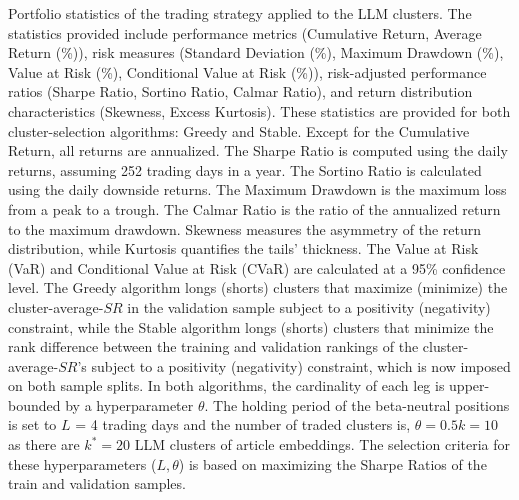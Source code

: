\begin{table}[H]
\begin{minipage}{\textwidth}
{Portfolio statistics of the trading strategy applied to the LLM clusters.
The statistics provided include performance metrics (Cumulative Return, Average Return (\%)), risk measures (Standard Deviation (\%), Maximum Drawdown (\%), Value at Risk (\%), Conditional Value at Risk (\%)), risk-adjusted performance ratios (Sharpe Ratio, Sortino Ratio, Calmar Ratio), and return distribution characteristics (Skewness, Excess Kurtosis). These statistics are provided for both cluster-selection algorithms: Greedy and Stable. 
Except for the Cumulative Return, all returns are annualized. The Sharpe Ratio is computed using the daily returns, assuming 252 trading days in a year. The Sortino Ratio is calculated using the daily downside returns. The Maximum Drawdown is the maximum loss from a peak to a trough. The Calmar Ratio is the ratio of the annualized return to the maximum drawdown. Skewness measures the asymmetry of the return distribution, while Kurtosis quantifies the tails' thickness. The Value at Risk (VaR) and Conditional Value at Risk (CVaR) are calculated at a 95\% confidence level.
The Greedy algorithm longs (shorts) clusters that maximize (minimize) the cluster-average-$SR$ in the validation sample subject to a positivity (negativity) constraint, while the Stable algorithm longs (shorts) clusters that minimize the rank difference between the training and validation rankings of the cluster-average-$SR$'s subject to a positivity (negativity) constraint, which is now imposed on both sample splits. In both algorithms, the cardinality of each leg is upper-bounded by a hyperparameter $\theta$. 
The holding period of the beta-neutral positions is set to $L$ = 4 trading days and the number of traded clusters is, $\theta = 0.5k=10$ as there are $k^*=20$ LLM clusters of article embeddings. The selection criteria for these hyperparameters ($L,\theta$) is based on maximizing the Sharpe Ratios of the train and validation samples.
}
\end{minipage}
\end{table}
